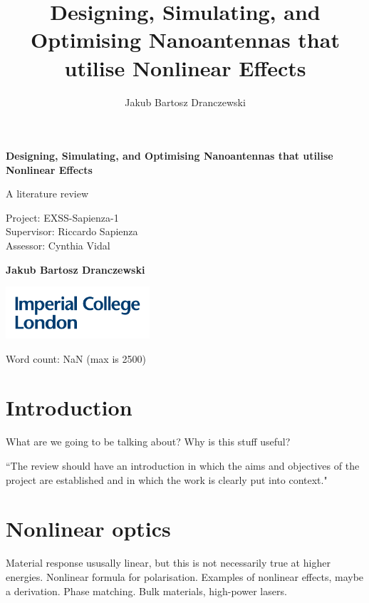 \documentclass[12pt,a4paper]{article}
\author{Jakub Bartosz Dranczewski}
\title{Designing, Simulating, and Optimising Nanoantennas that utilise Nonlinear Effects}
\date{}
\begin{document}
\begin{titlepage}
	\begin{center}
		\vspace*{1cm}
		
		\Huge
		\textbf{Designing, Simulating, and Optimising Nanoantennas that utilise Nonlinear Effects}
		
		\Large
		A literature review
		
		\vspace{1.2cm}
		\large
		Project: EXSS-Sapienza-1\\
		Supervisor: Riccardo Sapienza\\
		Assessor: Cynthia Vidal
		
		\vspace{1.5cm}
		
		\textbf{Jakub Bartosz Dranczewski}
		
		\vfill
		
		\includegraphics[width=0.4\textwidth]{img/Imperial-logo.pdf}
		
		\vspace{0.4cm}
		
		
		Word count: NaN (max is 2500)
		
	\end{center}
\end{titlepage}

\begin{abstract}
\lipsum[9]

\end{abstract}

\section{Introduction}
What are we going to be talking about? Why is this stuff useful?

\noindent
``The review should have an introduction in which the aims and objectives of the project are established and in which the work is clearly put into context."

\section{Nonlinear optics}
Material response ususally linear, but this is not necessarily true at higher energies. Nonlinear formula for polarisation. Examples of nonlinear effects, maybe a derivation. Phase matching. Bulk materials, high-power lasers.
\end{document}
